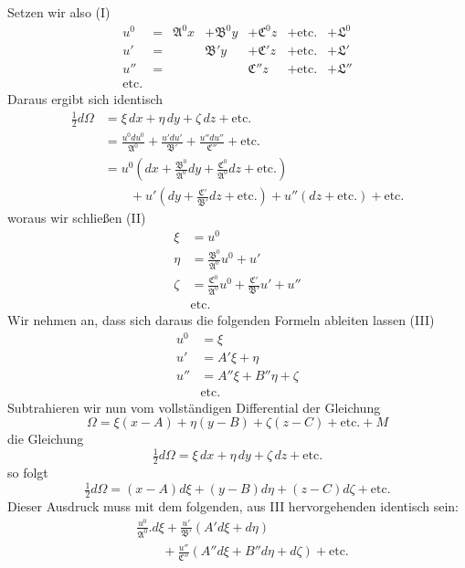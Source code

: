 Setzen wir also (I)
\[
\begin{array}{rclllll}
u^0&=&\mathfrak{A}^0x&+\mathfrak{B}^0y&+\mathfrak{C}^0z&+\text{etc.}&+\mathfrak{L}^0\\
u'&=&&\mathfrak{B}'y&+\mathfrak{C}'z&+\text{etc.}&+\mathfrak{L}'\\
u''&=&&&\mathfrak{C}''z&+\text{etc.}&+\mathfrak{L}''\\
\text{etc.}
\end{array}
\]
Daraus ergibt sich identisch
\[
\begin{aligned}
\tfrac12d\Omega&=\xi\,dx+\eta\,dy+\zeta\,dz+\text{etc.}\\[3pt]
&=\frac{u^0du^0}{\mathfrak{A}^0}+\frac{u'du'}{\mathfrak{B}'}+\frac{u''du''}{\mathfrak{C}''}+\text{etc.}\\[3pt]
&=u^0\left(dx+\frac{\mathfrak{B}^0}{\mathfrak{A}^0}dy+\frac{\mathfrak{C}^0}{\mathfrak{A}^0}dz+\text{etc.}\right)\\
&\qquad+u'\left(dy+\frac{\mathfrak{C}'}{\mathfrak{B}'}dz+\text{etc.}\right)+u''(dz+\text{etc.})+\text{etc.}
\end{aligned}
\]
woraus wir schließen (II)
\[
\begin{aligned}
\xi&=u^0\\
\eta&=\frac{\mathfrak{B}^0}{\mathfrak{A}^0}u^0+u'\\
\zeta&=\frac{\mathfrak{C}^0}{\mathfrak{A}^0}u^0+\frac{\mathfrak{C}'}{\mathfrak{B}'}u'+u''\\
&\text{etc.}
\end{aligned}
\]
Wir nehmen an, dass sich daraus die folgenden Formeln ableiten lassen (III)
\[
\begin{aligned}
u^0&=\xi\\
u'&=A'\xi+\eta\\
u''&=A''\xi+B''\eta+\zeta\\
&\text{etc.}
\end{aligned}
\]
Subtrahieren wir nun vom vollständigen Differential der Gleichung
\[
\Omega=\xi(x-A)+\eta(y-B)+\zeta(z-C)+\text{etc.}+M
\]
die Gleichung
\[
\tfrac12d\Omega=\xi\,dx+\eta\,dy+\zeta\,dz+\text{etc.}
\]
so folgt
\[
\tfrac12d\Omega=(x-A)d\xi+(y-B)d\eta+(z-C)d\zeta+\text{etc.}
\]
Dieser Ausdruck muss mit dem folgenden, aus III hervorgehenden identisch sein:
\[
\begin{aligned}
&\frac{u^0}{\mathfrak{A}^0}.d\xi+\frac{u'}{\mathfrak{B}'}(A'd\xi+d\eta)\\
&\qquad+\frac{u''}{\mathfrak{C}''}(A''d\xi+B''d\eta+d\zeta)+\text{etc.}
\end{aligned}
\]
